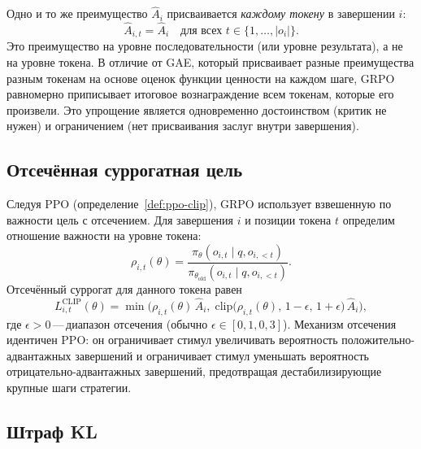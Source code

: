 \begin{remark}
Одно и то же преимущество $\hat{A}_i$ присваивается \emph{каждому токену} в завершении $i$:
\[
\hat{A}_{i,t} = \hat{A}_i \quad \mbox{для всех } t \in \{1, \ldots, |o_i|\}.
\]
Это преимущество на уровне последовательности (или уровне результата), а не на уровне токена. В отличие от GAE, который присваивает разные преимущества разным токенам на основе оценок функции ценности на каждом шаге, GRPO равномерно приписывает итоговое вознаграждение всем токенам, которые его произвели. Это упрощение является одновременно достоинством (критик не нужен) и ограничением (нет присваивания заслуг внутри завершения).
\end{remark}

\subsection{Отсечённая суррогатная цель}

Следуя PPO (определение~\ref{def:ppo-clip}), GRPO использует взвешенную по важности цель с отсечением. Для завершения $i$ и позиции токена $t$ определим отношение важности на уровне токена:
\begin{equation}
\label{eq:grpo-ratio}
\rho_{i,t}(\theta) = \frac{\pi_\theta(o_{i,t} \mid q, o_{i,<t})}{\pi_{\theta_\mathrm{old}}(o_{i,t} \mid q, o_{i,<t})}.
\end{equation}
Отсечённый суррогат для данного токена равен
\begin{equation}
\label{eq:grpo-clip-token}
L_{i,t}^{\mathrm{CLIP}}(\theta) = \min\!\Big(\rho_{i,t}(\theta)\,\hat{A}_i,\; \mathrm{clip}\!\big(\rho_{i,t}(\theta),\, 1-\epsilon,\, 1+\epsilon\big)\,\hat{A}_i\Big),
\end{equation}
где $\epsilon > 0$\,---\,диапазон отсечения (обычно $\epsilon \in [0{,}1, 0{,}3]$). Механизм отсечения идентичен PPO: он ограничивает стимул увеличивать вероятность положительно-адвантажных завершений и ограничивает стимул уменьшать вероятность отрицательно-адвантажных завершений, предотвращая дестабилизирующие крупные шаги стратегии.

\subsection{Штраф KL}

